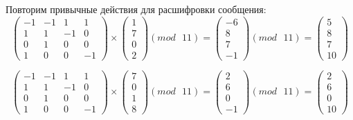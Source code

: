 \documentclass[a5paper, 10pt]{article}
\theoremstyle{definition}
\theoremstyle{plain}
\theoremstyle{remark}
\begin{document}
Повторим привычные действия для расшифровки сообщения:
\begin{equation}
\begin{pmatrix}
-1 & -1 & 1 & 1\\
1 & 1 & -1 & 0 \\
0 & 1 & 0 & 0 \\
1 & 0 & 0 & -1
\end{pmatrix}
 \times
\begin{pmatrix}
1\\
7\\
0\\
2
\end{pmatrix}
(mod \text{ }11)
= 
\begin{pmatrix}
-6\\
8\\
7\\
-1
\end{pmatrix}
(mod \text{ }11)
= \begin{pmatrix}
5\\
8\\
7\\
10
\end{pmatrix}
\end{equation}

\begin{equation}
\begin{pmatrix}
-1 & -1 & 1 & 1\\
1 & 1 & -1 & 0 \\
0 & 1 & 0 & 0 \\
1 & 0 & 0 & -1
\end{pmatrix}
 \times
\begin{pmatrix}
7\\
0\\
1\\
8
\end{pmatrix}
(mod \text{ }11)
= 
\begin{pmatrix}
2\\
6\\
0\\
-1
\end{pmatrix}
(mod \text{ }11)
= \begin{pmatrix}
2\\
6\\
0\\
10
\end{pmatrix}
\end{equation}
\end{document}
